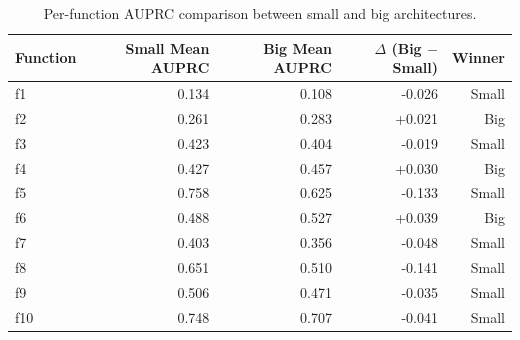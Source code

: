\begin{table}[ht]
\centering
\caption{Per-function AUPRC comparison between small and big architectures.}
\label{tab:architecture_comparison}
\begin{tabular}{lrrrr}
\toprule
Function & Small Mean AUPRC & Big Mean AUPRC & $\Delta$ (Big $-$ Small) & Winner \\
\midrule
f1 & 0.134 & 0.108 & -0.026 & Small \\
f2 & 0.261 & 0.283 & +0.021 & Big \\
f3 & 0.423 & 0.404 & -0.019 & Small \\
f4 & 0.427 & 0.457 & +0.030 & Big \\
f5 & 0.758 & 0.625 & -0.133 & Small \\
f6 & 0.488 & 0.527 & +0.039 & Big \\
f7 & 0.403 & 0.356 & -0.048 & Small \\
f8 & 0.651 & 0.510 & -0.141 & Small \\
f9 & 0.506 & 0.471 & -0.035 & Small \\
f10 & 0.748 & 0.707 & -0.041 & Small \\
\bottomrule
\end{tabular}
\end{table}